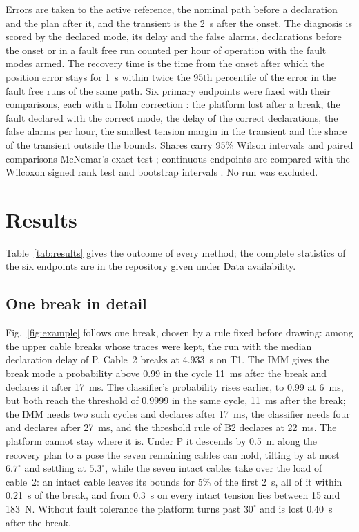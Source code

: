 \documentclass[a4paper,fleqn]{cas-dc}
\newcommand{\tablefile}[1]{\IfFileExists{tables/#1.tex}{}{}}
\begin{document}
Errors are taken to the active reference, the nominal path before a declaration and the plan after it, and the transient is the 2~s after the onset. The diagnosis is scored by the declared mode, its delay and the false alarms, declarations before the onset or in a fault free run counted per hour of operation with the fault modes armed. The recovery time is the time from the onset after which the position error stays for 1~s within twice the 95th percentile of the error in the fault free runs of the same path. Six primary endpoints were fixed with their comparisons, each with a Holm correction \citep{holm1979}: the platform lost after a break, the fault declared with the correct mode, the delay of the correct declarations, the false alarms per hour, the smallest tension margin in the transient and the share of the transient outside the bounds. Shares carry 95\% Wilson intervals \citep{wilson1927} and paired comparisons McNemar's exact test \citep{mcnemar1947}; continuous endpoints are compared with the Wilcoxon signed rank test \citep{wilcoxon1945} and bootstrap intervals \citep{efron1993bootstrap}. No run was excluded.

\section{Results}\label{sec:results}

Table~\ref{tab:results} gives the outcome of every method; the complete statistics of the six endpoints are in the repository given under Data availability.

\tablefile{tab_results}

\subsection{One break in detail}\label{sec:example}

Fig.~\ref{fig:example} follows one break, chosen by a rule fixed before drawing: among the upper cable breaks whose traces were kept, the run with the median declaration delay of P. Cable~2 breaks at 4.933~s on T1. The IMM gives the break mode a probability above 0.99 in the cycle 11~ms after the break and declares it after 17~ms. The classifier's probability rises earlier, to 0.99 at 6~ms, but both reach the threshold of 0.9999 in the same cycle, 11~ms after the break; the IMM needs two such cycles and declares after 17~ms, the classifier needs four and declares after 27~ms, and the threshold rule of B2 declares at 22~ms. The platform cannot stay where it is. Under P it descends by 0.5~m along the recovery plan to a pose the seven remaining cables can hold, tilting by at most $6.7^\circ$ and settling at $5.3^\circ$, while the seven intact cables take over the load of cable~2: an intact cable leaves its bounds for 5\% of the first 2~s, all of it within 0.21~s of the break, and from 0.3~s on every intact tension lies between 15 and 183~N. Without fault tolerance the platform turns past $30^\circ$ and is lost 0.40~s after the break.
\end{document}
